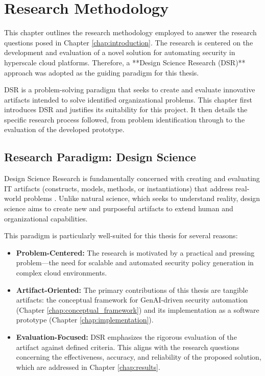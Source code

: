 \chapter{Research Methodology}
\label{chap:methodology}

This chapter outlines the research methodology employed to answer the research questions posed in Chapter \ref{chap:introduction}. The research is centered on the development and evaluation of a novel solution for automating security in hyperscale cloud platforms. Therefore, a **Design Science Research (DSR)** approach was adopted as the guiding paradigm for this thesis.

DSR is a problem-solving paradigm that seeks to create and evaluate innovative artifacts intended to solve identified organizational problems. This chapter first introduces DSR and justifies its suitability for this project. It then details the specific research process followed, from problem identification through to the evaluation of the developed prototype.

\section{Research Paradigm: Design Science}
\label{sec:research_paradigm}

Design Science Research is fundamentally concerned with creating and evaluating IT artifacts (constructs, models, methods, or instantiations) that address real-world problems \cite{hevner_design_2004}. Unlike natural science, which seeks to understand reality, design science aims to create new and purposeful artifacts to extend human and organizational capabilities.

This paradigm is particularly well-suited for this thesis for several reasons:
\begin{itemize}
    \item \textbf{Problem-Centered:} The research is motivated by a practical and pressing problem—the need for scalable and automated security policy generation in complex cloud environments.
    \item \textbf{Artifact-Oriented:} The primary contributions of this thesis are tangible artifacts: the conceptual framework for GenAI-driven security automation (Chapter \ref{chap:conceptual_framework}) and its implementation as a software prototype (Chapter \ref{chap:implementation}).
    \item \textbf{Evaluation-Focused:} DSR emphasizes the rigorous evaluation of the artifact against defined criteria. This aligns with the research questions concerning the effectiveness, accuracy, and reliability of the proposed solution, which are addressed in Chapter \ref{chap:results}.
\end{itemize}

